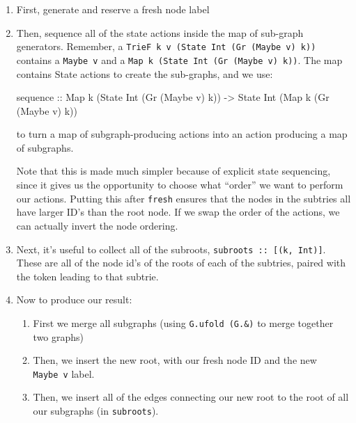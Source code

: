 \documentclass[]{article}
\newenvironment{Shaded}{}{}
\newcommand{\DataTypeTok}[1]{\textcolor[rgb]{0.56,0.13,0.00}{#1}}
\newcommand{\FunctionTok}[1]{\textcolor[rgb]{0.02,0.16,0.49}{#1}}
\newcommand{\NormalTok}[1]{#1}
\newcommand{\OtherTok}[1]{\textcolor[rgb]{0.00,0.44,0.13}{#1}}
\begin{document}
\begin{enumerate}
\def\labelenumi{\arabic{enumi}.}
\item
  First, generate and reserve a fresh node label
\item
  Then, sequence all of the state actions inside the map of sub-graph
  generators. Remember, a
  \texttt{TrieF\ k\ v\ (State\ Int\ (Gr\ (Maybe\ v)\ k))} contains a
  \texttt{Maybe\ v} and a \texttt{Map\ k\ (State\ Int\ (Gr\ (Maybe\ v)\ k))}.
  The map contains State actions to create the sub-graphs, and we use:

\begin{Shaded}
\begin{Highlighting}[]
\FunctionTok{sequence}
\OtherTok{    ::} \DataTypeTok{Map}\NormalTok{ k (}\DataTypeTok{State} \DataTypeTok{Int}\NormalTok{ (}\DataTypeTok{Gr}\NormalTok{ (}\DataTypeTok{Maybe}\NormalTok{ v) k))}
    \OtherTok{->} \DataTypeTok{State} \DataTypeTok{Int}\NormalTok{ (}\DataTypeTok{Map}\NormalTok{ k (}\DataTypeTok{Gr}\NormalTok{ (}\DataTypeTok{Maybe}\NormalTok{ v) k))}
\end{Highlighting}
\end{Shaded}

  to turn a map of subgraph-producing actions into an action producing a map of
  subgraphs.

  Note that this is made much simpler because of explicit state sequencing,
  since it gives us the opportunity to choose what ``order'' we want to perform
  our actions. Putting this after \texttt{fresh} ensures that the nodes in the
  subtries all have larger ID's than the root node. If we swap the order of the
  actions, we can actually invert the node ordering.
\item
  Next, it's useful to collect all of the subroots,
  \texttt{subroots\ ::\ {[}(k,\ Int){]}}. These are all of the node id's of the
  roots of each of the subtries, paired with the token leading to that subtrie.
\item
  Now to produce our result:

  \begin{enumerate}
  \def\labelenumii{\alph{enumii}.}
  \tightlist
  \item
    First we merge all subgraphs (using \texttt{G.ufold\ (G.\&)} to merge
    together two graphs)
  \item
    Then, we insert the new root, with our fresh node ID and the new
    \texttt{Maybe\ v} label.
  \item
    Then, we insert all of the edges connecting our new root to the root of all
    our subgraphs (in \texttt{subroots}).
  \end{enumerate}
\end{enumerate}
\end{document}
